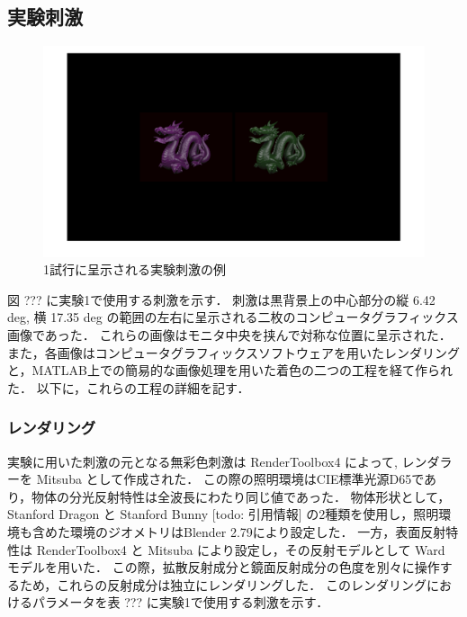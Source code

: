     \subsection{実験刺激}

        \begin{figure}[h]
            \centering
            \includegraphics[width=14.0cm]{./img/ex1_stimuli.png}
            \caption{1試行に呈示される実験刺激の例}
            \label{darkroom}
        \end{figure}

        図 ??? に実験1で使用する刺激を示す．
        刺激は黒背景上の中心部分の縦 6.42 deg, 横 17.35 deg の範囲の左右に呈示される二枚のコンピュータグラフィックス画像であった．
        これらの画像はモニタ中央を挟んで対称な位置に呈示された．
        また，各画像はコンピュータグラフィックスソフトウェアを用いたレンダリングと，MATLAB上での簡易的な画像処理を用いた着色の二つの工程を経て作られた．
        以下に，これらの工程の詳細を記す．

        \subsubsection{レンダリング}

            実験に用いた刺激の元となる無彩色刺激は RenderToolbox4 によって, レンダラーを Mitsuba として作成された．
            この際の照明環境はCIE標準光源D65であり，物体の分光反射特性は全波長にわたり同じ値であった．
            物体形状として，Stanford Dragon と Stanford Bunny [todo: 引用情報] の2種類を使用し，照明環境も含めた環境のジオメトリはBlender 2.79により設定した．
            一方，表面反射特性は RenderToolbox4 と Mitsuba により設定し，その反射モデルとして Ward モデルを用いた．
            この際，拡散反射成分と鏡面反射成分の色度を別々に操作するため，これらの反射成分は独立にレンダリングした．
            このレンダリングにおけるパラメータを表 ??? に実験1で使用する刺激を示す．

